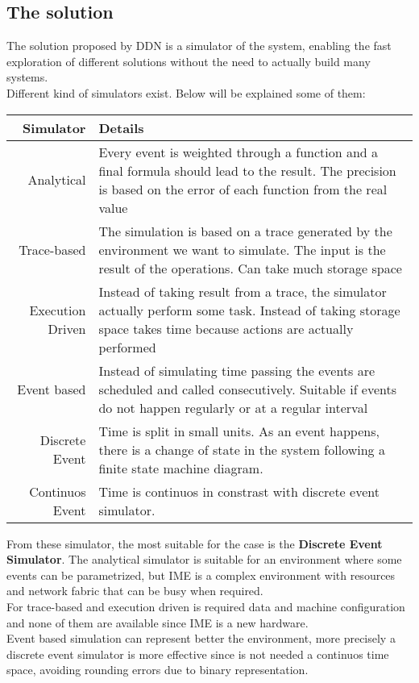 \subsection{The solution}
The solution proposed by DDN is a simulator of the system, enabling the fast
exploration of different solutions without the need to actually build many
systems. \\
Different kind of simulators exist. Below will be explained some of them:

\vspace{0.5cm}
\begin{tabular}{r | p{}}
    \textbf{Simulator} & \textbf{Details} \\ \hline
    Analytical & 
    Every event is weighted through a function and a final formula
    should lead to the result. The precision is based on the error of each
    function from the real value \\ \hline

    Trace-based &
    The simulation is based on a trace generated by the environment we
    want to simulate. The input is the result of the operations. Can take much
    storage space\\\hline

    Execution Driven &
    Instead of taking result from a trace, the simulator
    actually perform some task. Instead of taking storage space takes time
    because actions are actually performed\\\hline

    Event based & 
    Instead of simulating time passing the events are scheduled
    and called consecutively. Suitable if events do not happen regularly or at a
    regular interval\\\hline
    
    Discrete Event & 
    Time is split in small units. As an event happens, there is
    a change of state in the system following a finite state machine
    diagram.\\\hline

    Continuos Event & 
    Time is continuos in constrast with discrete event simulator.
\end{tabular}
\vspace{0.5cm}

From these simulator, the most suitable for the case is the \textbf{Discrete
Event Simulator}. The analytical simulator is suitable for an environment where
some events can be parametrized, but IME is a complex environment with resources
and network fabric that can be busy when required. \\
For trace-based and execution driven is required data and machine configuration
and none of them are available since IME is a new hardware. \\
Event based simulation can represent better the environment, more precisely a
discrete event simulator is more effective since is not needed a continuos time
space, avoiding rounding errors due to binary representation.

